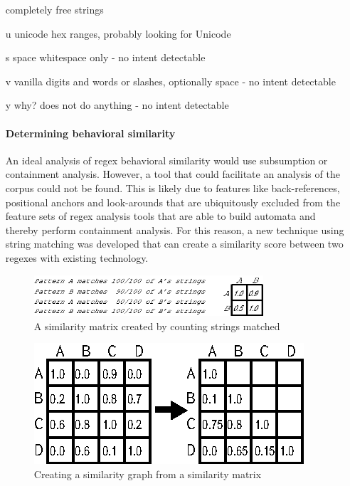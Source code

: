 \begin{itemize}
completely free strings
\item[ u ] unicode     hex ranges, probably looking for Unicode
\item[ s ] space       whitespace only - no intent detectable
\item[ v ] vanilla     digits and words or slashes, optionally space - no intent detectable
\item[ y ] why?        does not do anything - no intent detectable



\paragraph{Determining behavioral similarity} An ideal analysis of regex behavioral similarity would use subsumption or containment analysis. However, a tool that could facilitate an analysis of the corpus could not be found.  This is likely due to features like back-references, positional anchors and look-arounds that are ubiquitously excluded from the feature sets of regex analysis tools that are able to build automata and thereby perform containment analysis.  For this reason, a new technique using string matching was developed that can create a similarity score between two regexes with existing technology.

\begin{figure}[tb]
\centering
\includegraphics[height=0.6in]{nontex/illustrations/minimalMatrix.eps}
\caption{A similarity matrix created by counting strings matched}
\label{fig:minimalMatrix}
\end{figure}

\begin{figure}[tb]
\centering
\includegraphics[width=0.7\columnwidth]{nontex/illustrations/matrixToGraph.eps}
\vspace{-6pt}
\caption{Creating a similarity graph from a similarity matrix}
\vspace{-6pt}
\label{fig:matrixToGraph}
\end{figure}




\end{itemize}
